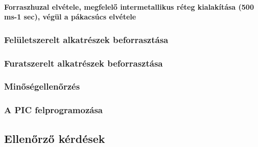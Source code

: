 \documentclass[../labor.tex]{subfiles}
\begin{document}
                \paragraph{Forraszhuzal elvétele, megfelelő intermetallikus réteg kialakítása (500 ms-1 sec), végül a pákacsúcs elvétele}

        \subsubsection{Felületszerelt alkatrészek beforrasztása}

        \subsubsection{Furatszerelt alkatrészek beforrasztása}
        
        \subsubsection{Minőségellenőrzés}

        \subsubsection{A PIC felprogramozása}

    \subsection{Ellenőrző kérdések}
\end{document}
